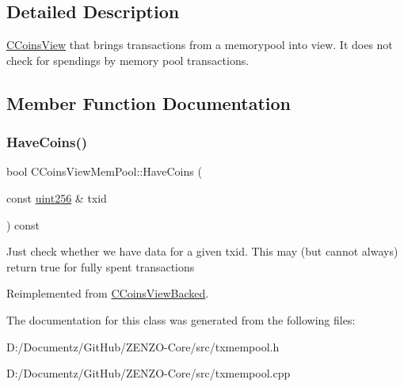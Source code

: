\subsection{Detailed Description}
\mbox{\hyperlink{class_c_coins_view}{C\+Coins\+View}} that brings transactions from a memorypool into view. It does not check for spendings by memory pool transactions. 

\subsection{Member Function Documentation}
\mbox{\label{class_c_coins_view_mem_pool_a2c5900448dc5570053060686ad1f014b}} 
\subsubsection{\texorpdfstring{HaveCoins()}{HaveCoins()}}
{\footnotesize\ttfamily bool C\+Coins\+View\+Mem\+Pool\+::\+Have\+Coins (\begin{DoxyParamCaption}\item[{const \mbox{\hyperlink{classuint256}{uint256}} \&}]{txid }\end{DoxyParamCaption}) const\hspace{0.3cm}{\ttfamily [virtual]}}

Just check whether we have data for a given txid. This may (but cannot always) return true for fully spent transactions 

Reimplemented from \mbox{\hyperlink{class_c_coins_view_backed_ad49041658bdec807d556e080476e6543}{C\+Coins\+View\+Backed}}.



The documentation for this class was generated from the following files\+:\begin{DoxyCompactItemize}
\item 
D\+:/\+Documentz/\+Git\+Hub/\+Z\+E\+N\+Z\+O-\/\+Core/src/txmempool.\+h\item 
D\+:/\+Documentz/\+Git\+Hub/\+Z\+E\+N\+Z\+O-\/\+Core/src/txmempool.\+cpp\end{DoxyCompactItemize}
